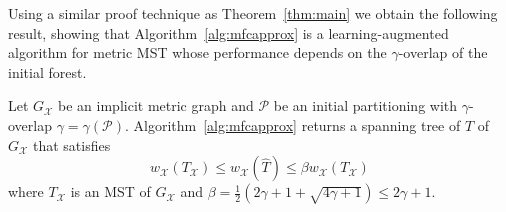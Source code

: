Using a similar proof technique as Theorem~\ref{thm:main} we obtain the following result, showing that Algorithm~\ref{alg:mfcapprox} is a learning-augmented algorithm for metric MST whose performance depends on the $\gamma$-overlap of the initial forest. 
\begin{theorem}
	\label{thm:learning}
	Let $G_\mathcal{X}$ be an implicit metric graph and $\mathcal{P}$ be an initial partitioning with $\gamma$-overlap $\gamma = \gamma(\mathcal{P})$. Algorithm~\ref{alg:mfcapprox} returns a spanning tree of $\hat{T}$ of $G_\mathcal{X}$ that satisfies
	\begin{equation}
		w_\mathcal{X}(T_\mathcal{X}) \leq w_\mathcal{X}(\hat{T}) \leq \beta w_\mathcal{X}(T_\mathcal{X})
	\end{equation}
	where $T_\mathcal{X}$ is an MST of $G_\mathcal{X}$ and $\beta = \frac{1}{2}\left(2\gamma + 1 + \sqrt{4\gamma + 1} \right) \leq 2\gamma+ 1$.
\end{theorem}
